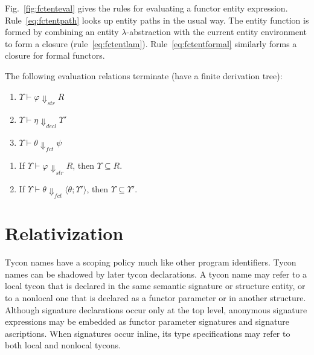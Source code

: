 
 
Fig.~\ref{fig:fctenteval} gives the rules for evaluating a functor entity expression. Rule~\ref{eq:fctentpath} looks up entity paths in the usual way. The entity function is formed by combining an entity $\lambda$-abstraction with the current entity environment to form a closure (rule~\ref{eq:fctentlam}). Rule~\ref{eq:fctentformal} similarly forms a closure for formal functors.  

\begin{lemma}
The following evaluation relations terminate (have a finite derivation tree):
\begin{enumerate}
\item $\Upsilon\vdash\varphi\Downarrow_{str}R$
\item $\Upsilon\vdash\eta\Downarrow_{decl}\Upsilon'$
\item $\Upsilon\vdash\theta\Downarrow_{fct} \psi$
\end{enumerate}
\end{lemma}

\begin{lemma}
\begin{enumerate}
\item If $\Upsilon \vdash \varphi \Downarrow_{str} R$, then
$\Upsilon\subseteq R$.
\item If $\Upsilon\vdash \theta \Downarrow_{fct}
\langle\theta;\Upsilon'\rangle$, then $\Upsilon\subseteq\Upsilon'$. 
\end{enumerate}
\end{lemma}

\section{Relativization}\label{sec:relativization}
Tycon names have a scoping policy much like other program identifiers. Tycon names can be shadowed by later tycon declarations. A tycon name may refer to a local tycon that is declared in the same semantic signature or structure entity, or to a nonlocal one that is declared as a functor parameter or in another structure. Although signature declarations occur only at the top level, anonymous signature expressions may be embedded as functor parameter signatures and signature ascriptions. When signatures occur inline, its type specifications may refer to both local and nonlocal tycons.

